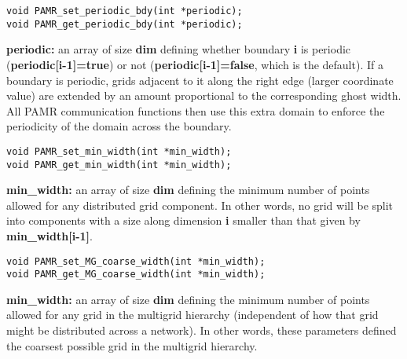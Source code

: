 \documentclass[aps,amssymb,unsortedaddress,nofootinbib]{revtex4}
\def\lsep{\itemsep 0.05in}
\begin{document}

\begin{verbatim}
void PAMR_set_periodic_bdy(int *periodic);
void PAMR_get_periodic_bdy(int *periodic);
\end{verbatim}
\begin{list}{}{\lsep}
\item {\bf *periodic:} an array of size {\bf dim} defining whether boundary {\bf i} is periodic 
                       ({\bf periodic[i-1]=true}) or not ({\bf periodic[i-1]=false}, which is the default). If a boundary
                       is periodic, grids adjacent to it along the right edge (larger coordinate value) 
                       are extended by an amount proportional to the corresponding ghost width. All PAMR 
                       communication functions then use this extra domain to enforce the periodicity
                       of the domain across the boundary.
\end{list}


\begin{verbatim}
void PAMR_set_min_width(int *min_width);
void PAMR_get_min_width(int *min_width);
\end{verbatim}
\begin{list}{}{\lsep}
\item {\bf *min\_width:} an array of size {\bf dim} defining the minimum number of points allowed for any
                      distributed grid component. In other words, no grid will be split into 
                      components with a size along dimension {\bf i} smaller than that given
                      by {\bf min\_width[i-1]}.
\end{list}


\begin{verbatim}
void PAMR_set_MG_coarse_width(int *min_width);
void PAMR_get_MG_coarse_width(int *min_width);
\end{verbatim}
\begin{list}{}{\lsep}
\item {\bf *min\_width:} an array of size {\bf dim} defining the minimum number of points allowed
                      for any grid in the multigrid hierarchy
                      (independent of how that grid might be distributed across a network).
                      In other words, these parameters defined the coarsest possible grid in the
                      multigrid hierarchy.
\end{list}
\end{document}
